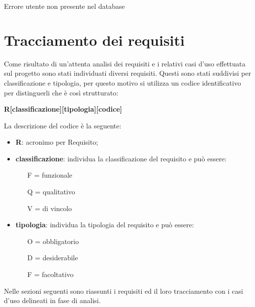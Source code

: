 \begin{usecase}{12}{Errore utente non presente nel database}\label{uc12}
\end{usecase}

\section{Tracciamento dei requisiti}
\label{bsec:tracciamento-requisiti}

Come risultato di un'attenta analisi dei requisiti e i relativi casi d'uso effettuata sul progetto sono stati individuati diversi requisiti. Questi sono stati suddivisi per classificazione e tipologia, per questo motivo si utilizza un codice identificativo per distinguerli che è così strutturato:
\begin{center}
	\textbf{R[classificazione][tipologia][codice]}
\end{center}
La descrizione del codice è la seguente:
\begin{itemize}
	\item \textbf{R}: acronimo per Requisito;
	\item \textbf{classificazione}: individua la classificazione del requisito e può essere:
	\begin{itemize}
		\item [F =] funzionale
		\item [Q =] qualitativo
		\item [V =]  di vincolo
	\end{itemize}
	\item \textbf{tipologia}: individua la tipologia del requisito e può essere:
	\begin{itemize}
		\item [O =] obbligatorio
		\item [D =] desiderabile
		\item [F =] facoltativo
	\end{itemize}
\end{itemize}

Nelle sezioni seguenti sono riassunti i requisiti ed il loro tracciamento con i casi d'uso delineati in fase di analisi.


